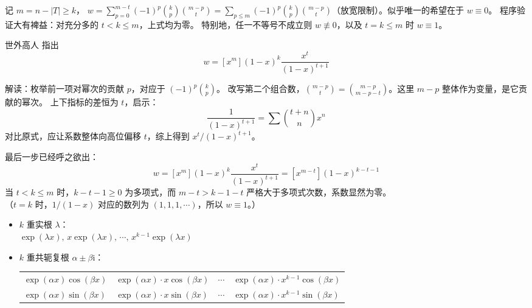 \documentclass[12pt, a4paper, UTF8, openany]{ctexbook}
\newcommand{\imunit}{\mathrm{i}}%
\begin{document}
        记 $m = n - |T| \geqslant k$，
        $w = \sum\limits_{p = 0}^{m - t} (-1)^p \binom{k}{p}\binom{m - p}{t} 
        = \sum\limits_{p \leqslant m} (-1)^p \binom{k}{p}\binom{m - p}{t}$（放宽限制）。似乎唯一的希望在于 $w \equiv 0$。
        程序验证大有裨益：对充分多的 $t < k \leqslant m$，上式均为零。
        特别地，任一不等号不成立则 $w \not\equiv 0$，以及 $t = k \leqslant m$ 时 $w \equiv 1$。

        世外高人 {}{} 指出
        $$w = [x^m](1 - x)^k\frac{x^t}{(1 - x)^{t + 1}}$$

        解读：枚举前一项对幂次的贡献 $p$，对应于 $(-1)^p\binom{k}{p}$。
        改写第二个组合数，$\binom{m - p}{t} = \binom{m - p}{m - p - t}$。这里 $m - p$ 整体作为变量，是它贡献的幂次。
        上下指标的差恒为 $t$，启示：
        $$\frac{1}{(1 - x)^{t + 1}} = \sum \binom{t + n}{n} x^n$$
        对比原式，应让系数整体向高位偏移 $t$，综上得到 $x^t / (1 - x)^{t + 1}$。

        最后一步已经呼之欲出：
        $$w = [x^m](1 - x)^k\frac{x^t}{(1 - x)^{t + 1}} = [x^{m - t}](1 - x)^{k - t - 1}$$
        当 $t < k \leqslant m$ 时，$k - t - 1 \geqslant 0$ 为多项式，而 $m - t > k - 1 - t$ 严格大于多项式次数，系数显然为零。\\
        （$t = k$ 时，$1 / (1 - x)$ 对应的数列为 $(1, 1, 1, \cdots)$，所以 $w \equiv 1$。）

        \begin{itemize}
            \item $k$ 重实根 $\lambda$：\\
                $\exp(\lambda x), \, x\exp(\lambda x), \, \cdots, \, x^{k - 1}\exp(\lambda x)$
            \item $k$ 重共轭复根 $\alpha \pm \beta\imunit$：
                \begin{longtable}[h]{*{2}{w{c}{4cm}} w{c}{0.5cm} w{c}{4cm}}
                    $\exp(\alpha x)\cos(\beta x)$ & $\exp(\alpha x)\cdot x\cos(\beta x)$ 
                    & $\cdots$ & $\exp(\alpha x)\cdot x^{k - 1}\cos(\beta x)$ \\
                    $\exp(\alpha x)\sin(\beta x)$ & $\exp(\alpha x)\cdot x\sin(\beta x)$ 
                    & $\cdots$ & $\exp(\alpha x)\cdot x^{k - 1}\sin(\beta x)$
                \end{longtable}
        \end{itemize}
\end{document}
